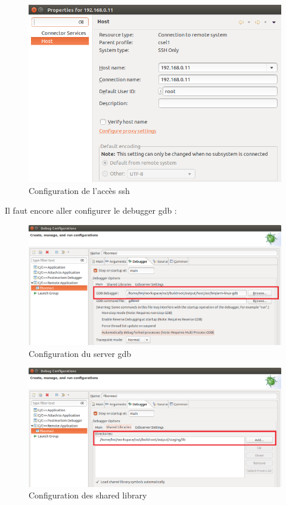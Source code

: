 \begin{figure}[H]
	\begin{center}
		\includegraphics[width=15cm]{img/eclipseConfig2.png}
		\caption{Configuration de l'accès ssh}
		\label{eclipseConfig2}
	\end{center}
\end{figure}
Il faut encore aller configurer le debugger gdb :
\begin{figure}[H]
	\begin{center}
		\includegraphics[width=15cm]{img/eclipseConfig3.png}
		\caption{Configuration du server gdb}
		\label{eclipseConfig3}
	\end{center}
\end{figure}
\begin{figure}[H]
	\begin{center}
		\includegraphics[width=16cm]{img/eclipseConfig4.png}
		\caption{Configuration des shared library}
		\label{eclipseConfig4}
	\end{center}
\end{figure}
